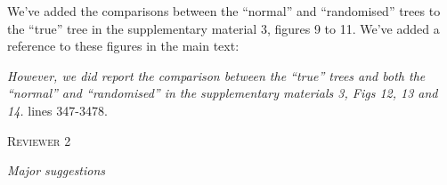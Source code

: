 \documentclass[12pt,letterpaper]{article}
\renewcommand{\section}[1]{%
\bigskip
\begin{center}
\begin{Large}
\normalfont\scshape #1
\medskip
\end{Large}
\end{center}}
\renewcommand{\subsection}[1]{%
\bigskip
\begin{center}
\begin{large}
\normalfont\itshape #1
\end{large}
\end{center}}
\begin{document}
\begin{enumerate}
We've added the comparisons between the ``normal'' and ``randomised'' trees to the ``true'' tree in the supplementary material 3, figures 9 to 11.
We've added a reference to these figures in the main text:

\textit{However, we did report the comparison between the ``true'' trees and both the ``normal'' and ``randomised'' in the supplementary materials 3, Figs 12, 13 and 14.} lines 347-3478.

\end{enumerate}





%
%





\section{Reviewer 2}

\subsection{Major suggestions}
\end{document}
